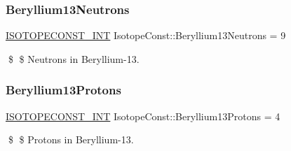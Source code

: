 \subsubsection{\texorpdfstring{Beryllium13\+Neutrons}{Beryllium13Neutrons}}
{\footnotesize\ttfamily \mbox{\hyperlink{group___isotope_const-_macros_ga5f18360b3e99483a35c32d789e62621c}{I\+S\+O\+T\+O\+P\+E\+C\+O\+N\+S\+T\+\_\+\+I\+NT}} Isotope\+Const\+::\+Beryllium13\+Neutrons = 9}

\$ \$ Neutrons in Beryllium-\/13. \mbox{\label{group___isotope_const-_beryllium-_be13_ga28e6068f49a605d43c51d9d4ff7e373f}} 
\subsubsection{\texorpdfstring{Beryllium13\+Protons}{Beryllium13Protons}}
{\footnotesize\ttfamily \mbox{\hyperlink{group___isotope_const-_macros_ga5f18360b3e99483a35c32d789e62621c}{I\+S\+O\+T\+O\+P\+E\+C\+O\+N\+S\+T\+\_\+\+I\+NT}} Isotope\+Const\+::\+Beryllium13\+Protons = 4}

\$ \$ Protons in Beryllium-\/13. 